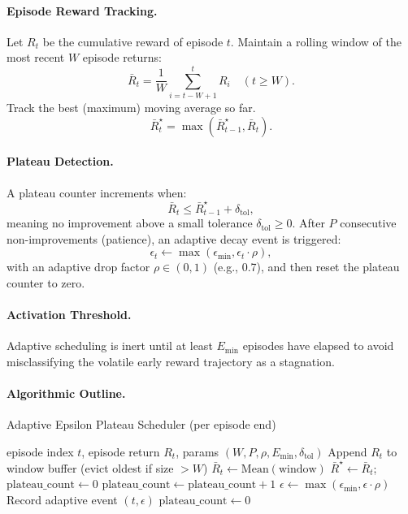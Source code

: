 \paragraph{Episode Reward Tracking.}
Let $R_t$ be the cumulative reward of episode $t$. Maintain a rolling window of the most recent $W$ episode returns:
\[
\bar{R}_t = \frac{1}{W} \sum_{i=t-W+1}^{t} R_i \quad (t \ge W).
\]
Track the best (maximum) moving average so far.
\[
\bar{R}^{\star}_t = \max(\bar{R}^{\star}_{t-1}, \bar{R}_t).
\]

\paragraph{Plateau Detection.}
A plateau counter increments when:
\[
\bar{R}_t \le \bar{R}^{\star}_{t-1} + \delta_{\text{tol}},
\]
meaning no improvement above a small tolerance $\delta_{\text{tol}} \ge 0$. After $P$ consecutive non-improvements (patience), an adaptive decay event is triggered:
\[
\epsilon_t \leftarrow \max(\epsilon_{\min}, \epsilon_t \cdot \rho),
\]
with an adaptive drop factor $\rho \in (0,1)$ (e.g., 0.7), and then reset the plateau counter to zero.

\paragraph{Activation Threshold.}
Adaptive scheduling is inert until at least $E_{\min}$ episodes have elapsed to avoid misclassifying the volatile early reward trajectory as a stagnation.

\paragraph{Algorithmic Outline.}
\begin{algorithm}[H]
\caption{Adaptive Epsilon Plateau Scheduler (per episode end)}
\label{alg:qlearn-eps}
\begin{algorithmic}[1]
\Require episode index $t$, episode return $R_t$, params $(W, P, \rho, E_{\min}, \delta_{\text{tol}})$
\State Append $R_t$ to window buffer (evict oldest if size $> W$)
 \State \Return
\EndIf
{} \State \Return
\EndIf
\State $\bar{R}_t \gets \text{Mean}(\text{window})$
   \State $\bar{R}^{\star} \gets \bar{R}_t$; $\text{plateau\_count} \gets 0$
\Else
   \State $\text{plateau\_count} \gets \text{plateau\_count} + 1$
       \State $\epsilon \gets \max(\epsilon_{\min}, \epsilon \cdot \rho)$
       \State Record adaptive event $(t, \epsilon)$
       \State $\text{plateau\_count} \gets 0$
   \EndIf
\EndIf
\end{algorithmic}
\end{algorithm}

